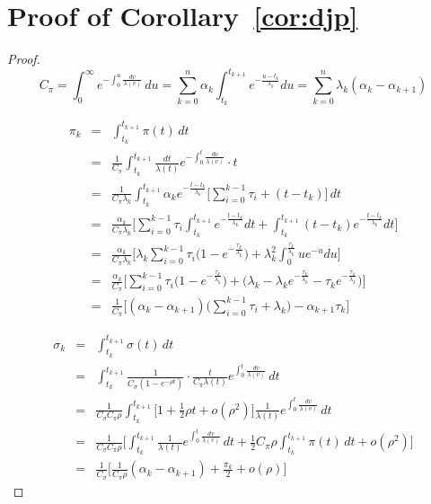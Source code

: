 \documentclass[pdftex,10pt]{article}
\begin{document}
\appendix

\section{Proof of Corollary~\ref{cor:djp}}\label{sec:pfl1}

\begin{proof}

\[
  C_{\pi}=\int_0^{\infty}e^{-\int_0^u\frac{dv}{\lambda(v)}}\,du
=\sum_{k=0}^{n}\alpha_k\int_{t_k}^{t_{k+1}} e^{-\frac{u-t_k}{\lambda_k}}du
=\sum_{k=0}^n\lambda_k(\alpha_k-\alpha_{k+1})
\]

\begin{eqnarray*}
  \pi_k&=&\int_{t_k}^{t_{k+1}}\pi(t)\,dt\\
  &=&\frac{1}{C_{\pi}}\int_{t_k}^{t_{k+1}}\frac{dt}{\lambda(t)}e^{-\int_0^t\frac{dv}{\lambda(v)}}\cdot t\\
  &=&\frac{1}{C_{\pi}\lambda_k}\int_{t_k}^{t_{k+1}}\alpha_k e^{-\frac{t-t_k}{\lambda_k}}\Bigg[\sum_{i=0}^{k-1}\tau_i
  +(t-t_k)\Bigg]\,dt\\
  &=&\frac{\alpha_k}{C_{\pi}\lambda_k}\Bigg[\sum_{i=0}^{k-1}\tau_i\int_{t_k}^{t_{k+1}}e^{-\frac{t-t_k}{\lambda_k}}dt
  +\int_{t_k}^{t_{k+1}}(t-t_k)e^{-\frac{t-t_k}{\lambda_k}}dt\Bigg]\\
  &=&\frac{\alpha_k}{C_{\pi}\lambda_k}\Bigg[\lambda_k\sum_{i=0}^{k-1}\tau_i\Big(1-e^{-\frac{\tau_k}{\lambda_k}}\Big)
  +\lambda_k^2\int_0^{\frac{\tau_k}{\lambda_k}}ue^{-u}du\Bigg]\\
  &=&\frac{\alpha_k}{C_{\pi}}\Bigg[\sum_{i=0}^{k-1}\tau_i\Big(1-e^{-\frac{\tau_k}{\lambda_k}}\Big)
  +\Big(\lambda_k-\lambda_k e^{-\frac{\tau_k}{\lambda_k}}-\tau_k e^{-\frac{\tau_k}{\lambda_k}}\Big)\Bigg]\\
  &=&\frac{1}{C_{\pi}}\Bigg[(\alpha_k-\alpha_{k+1})\Big(\sum_{i=0}^{k-1}\tau_i+\lambda_k\Big)
  -\alpha_{k+1}\tau_k\Bigg]
\end{eqnarray*}

\begin{eqnarray*}
  \sigma_k&=&\int_{t_k}^{t_{k+1}}\sigma(t)\,dt\\
  &=&\int_{t_k}^{t_{k+1}}\frac{1}{C_{\sigma}(1-e^{-\rho t})}\cdot\frac{t}{C_{\pi}\lambda(t)}
  e^{\int_0^t\frac{dv}{\lambda(v)}}\,dt\\
  &=&\frac{1}{C_{\sigma}C_{\pi}\rho}\int_{t_k}^{t_{k+1}}\Big[1+\frac{1}{2}\rho t+o(\rho^2)\Big]
  \frac{1}{\lambda(t)}e^{\int_0^t\frac{dv}{\lambda(v)}}\,dt\\
  &=&\frac{1}{C_{\sigma}C_{\pi}\rho}\Bigg[\int_{t_k}^{t_{k+1}}\frac{1}{\lambda(t)}e^{\int_0^t\frac{dv}{\lambda(v)}}\,dt
  +\frac{1}{2}C_{\pi}\rho\int_{t_k}^{t_{k+1}}\pi(t)\,dt+o(\rho^2)\Bigg]\\
  &=&\frac{1}{C_{\sigma}}\Bigg[\frac{1}{C_{\pi}\rho}(\alpha_k-\alpha_{k+1})
  +\frac{\pi_k}{2}+o(\rho)\Bigg]
\end{eqnarray*}


\end{proof}
\end{document}
